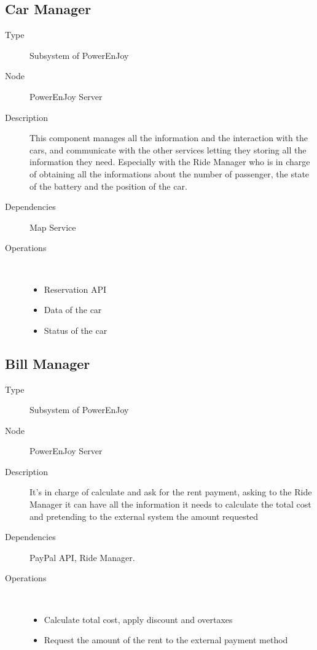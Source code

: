 \subsection{Car Manager}
\begin{description}
	\item[Type] Subsystem of PowerEnJoy
	\item[Node] PowerEnJoy Server
	\item[Description] This component manages all the information and the interaction with the cars, and communicate with the other services letting they storing all the information they need. Especially  with the Ride Manager who is in charge of obtaining all the informations about the number of passenger, the state of the battery and the position of the car.
	\item[Dependencies] Map Service
	\item[Operations] \ \\
		\begin{itemize}
			\item Reservation API
			\item Data of the car
			\item Status of the car
	\end{itemize}
\end{description}

\subsection{Bill Manager}
\begin{description}
	\item[Type] Subsystem of PowerEnJoy
	\item[Node] PowerEnJoy Server
	\item[Description] It's in charge of calculate and ask for the rent payment, asking to the Ride Manager it can have all the information it needs to calculate the total cost and pretending to the external system the amount requested
	\item[Dependencies] PayPal API, Ride Manager.
	\item[Operations] \ \\
		\begin{itemize}
			\item Calculate total cost, apply discount and overtaxes
			\item Request the amount of the rent to the external payment method
		\end{itemize}
\end{description}


